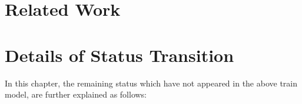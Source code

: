 \documentclass[article,dr=phil,type=msc,colorback,accentcolor=tud9c]{tudthesis}
\begin{document}
  \section{Related Work}
  
  
  
 
  
  \appendix
  \appendixpage
    
\renewcommand\refname{Appendix}
%
%

  \section{Details of Status Transition}

  In this chapter, the remaining status which have not appeared in the above train model, are further explained as follows:
\end{document}
